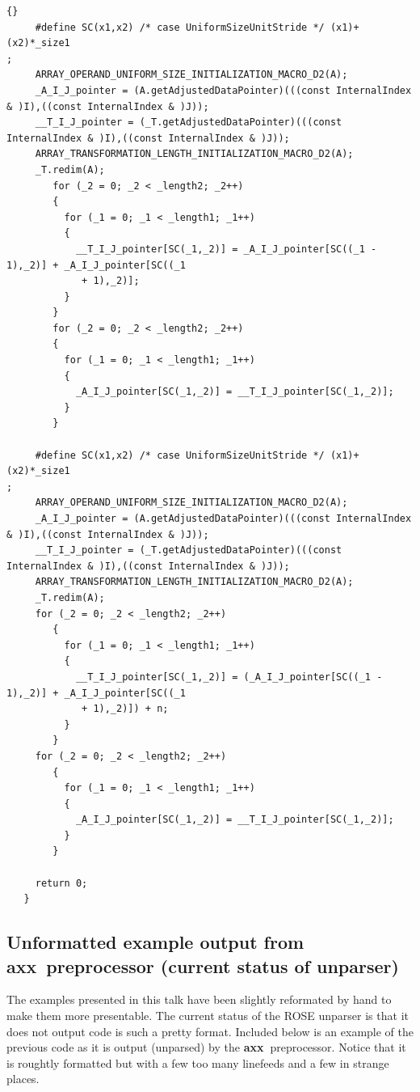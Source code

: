 \documentclass[10pt]{article}
\newcommand{\axx}{{\bf axx\ }}
\begin{document}
\begin{lstlisting}{}
     #define SC(x1,x2) /* case UniformSizeUnitStride */ (x1)+(x2)*_size1
; 
     ARRAY_OPERAND_UNIFORM_SIZE_INITIALIZATION_MACRO_D2(A); 
     _A_I_J_pointer = (A.getAdjustedDataPointer)(((const InternalIndex & )I),((const InternalIndex & )J)); 
     __T_I_J_pointer = (_T.getAdjustedDataPointer)(((const InternalIndex & )I),((const InternalIndex & )J)); 
     ARRAY_TRANSFORMATION_LENGTH_INITIALIZATION_MACRO_D2(A); 
     _T.redim(A); 
        for (_2 = 0; _2 < _length2; _2++)
        { 
          for (_1 = 0; _1 < _length1; _1++)
          { 
            __T_I_J_pointer[SC(_1,_2)] = _A_I_J_pointer[SC((_1 - 1),_2)] + _A_I_J_pointer[SC((_1
             + 1),_2)]; 
          } 
        } 
        for (_2 = 0; _2 < _length2; _2++)
        { 
          for (_1 = 0; _1 < _length1; _1++)
          { 
            _A_I_J_pointer[SC(_1,_2)] = __T_I_J_pointer[SC(_1,_2)]; 
          } 
        } 
        
     #define SC(x1,x2) /* case UniformSizeUnitStride */ (x1)+(x2)*_size1
; 
     ARRAY_OPERAND_UNIFORM_SIZE_INITIALIZATION_MACRO_D2(A); 
     _A_I_J_pointer = (A.getAdjustedDataPointer)(((const InternalIndex & )I),((const InternalIndex & )J)); 
     __T_I_J_pointer = (_T.getAdjustedDataPointer)(((const InternalIndex & )I),((const InternalIndex & )J)); 
     ARRAY_TRANSFORMATION_LENGTH_INITIALIZATION_MACRO_D2(A); 
     _T.redim(A); 
     for (_2 = 0; _2 < _length2; _2++)
        { 
          for (_1 = 0; _1 < _length1; _1++)
          { 
            __T_I_J_pointer[SC(_1,_2)] = (_A_I_J_pointer[SC((_1 - 1),_2)] + _A_I_J_pointer[SC((_1
             + 1),_2)]) + n; 
          } 
        } 
     for (_2 = 0; _2 < _length2; _2++)
        { 
          for (_1 = 0; _1 < _length1; _1++)
          { 
            _A_I_J_pointer[SC(_1,_2)] = __T_I_J_pointer[SC(_1,_2)]; 
          } 
        } 

     return 0;
   } 

\end{lstlisting}

\subsection{Unformatted example output from \axx preprocessor (current status of unparser)}

   The examples presented in this talk have been slightly reformated by hand to make them more presentable.
The current status of the ROSE unparser is that it does not output code is such a pretty format.  Included
below is an example of the previous code as it is output (unparsed) by the \axx preprocessor.  Notice that
it is roughtly formatted but with a few too many linefeeds and a few in strange places.
\end{document}
